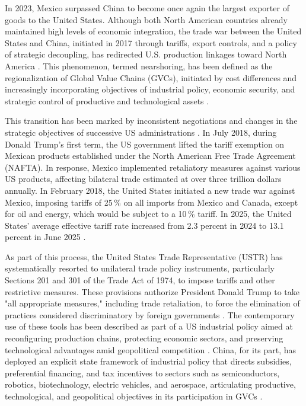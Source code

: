 \documentclass[11pt]{article}
\begin{document}
In 2023, Mexico surpassed China to become once again the largest exporter of goods to the United States. Although both North American countries already maintained high levels of economic integration, the trade war between the United States and China, initiated in 2017 through tariffs, export controls, and a policy of strategic decoupling, has redirected U.S. production linkages toward North America \citep{OropezaGarcia2024}. This phenomenon, termed nearshoring, has been defined as the regionalization of Global Value Chains (GVCs), initiated by cost differences and increasingly incorporating objectives of industrial policy, economic security, and strategic control of productive and technological assets \citep{Gereffi2025,Yellen2022,Xing2018}.

This transition has been marked by inconsistent negotiations and changes in the strategic objectives of successive US administrations \citep{Freund2025}. In July 2018, during Donald Trump's first term, the US government lifted the tariff exemption on Mexican products established under the North American Free Trade Agreement (NAFTA). In response, Mexico implemented retaliatory measures against various US products, affecting bilateral trade estimated at over three trillion dollars annually. In February 2018, the United States initiated a new trade war against Mexico, imposing tariffs of 25\,\% on all imports from Mexico and Canada, except for oil and energy, which would be subject to a 10\,\% tariff. In 2025, the United States' average effective tariff rate increased from 2.3 percent in 2024 to 13.1 percent in June 2025 \citep{Reinhart2025}.

As part of this process, the United States Trade Representative (USTR) has systematically resorted to unilateral trade policy instruments, particularly Sections 201 and 301 of the Trade Act of 1974, to impose tariffs and other restrictive measures. These provisions authorize President Donald Trump to take "all appropriate measures," including trade retaliation, to force the elimination of practices considered discriminatory by foreign governments \citep{RuizEstrada2025}. The contemporary use of these tools has been described as part of a US industrial policy aimed at reconfiguring production chains, protecting economic sectors, and preserving technological advantages amid geopolitical competition \citep{Ju2024}. China, for its part, has deployed an explicit state framework of industrial policy that directs subsidies, preferential financing, and tax incentives to sectors such as semiconductors, robotics, biotechnology, electric vehicles, and aerospace, articulating productive, technological, and geopolitical objectives in its participation in GVCs \citep{Autor2021,KehoeXu2025}.
\end{document}
